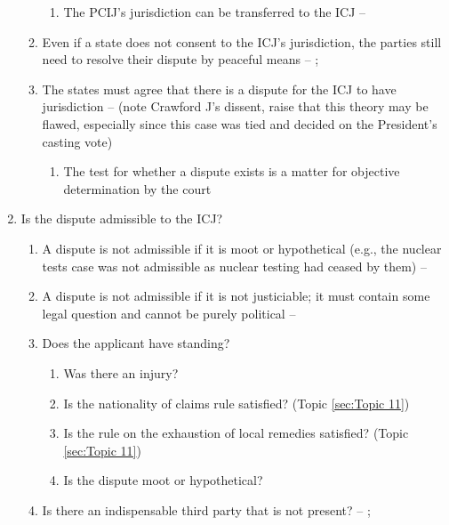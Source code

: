 \begin{enumerate}
\begin{enumerate}
\begin{enumerate}
            \item The PCIJ's jurisdiction can be transferred to the ICJ -- 
        \end{enumerate}
        \item Even if a state does not consent to the ICJ's jurisdiction, the parties still need to resolve their dispute by peaceful means -- ; 
        \item The states must agree that there is a dispute for the ICJ to have jurisdiction --  (note Crawford J's dissent, raise that this theory may be flawed, especially since this case was tied and decided on the President's casting vote)
        \begin{enumerate}
            \item The test for whether a dispute exists is a matter for objective determination by the court
        \end{enumerate}
    \end{enumerate}
    \item Is the dispute admissible to the ICJ?
    \begin{enumerate}
        \item A dispute is not admissible if it is moot or hypothetical (e.g., the nuclear tests case was not admissible as nuclear testing had ceased by them) -- 
        \item A dispute is not admissible if it is not justiciable; it must contain some legal question and cannot be purely political -- 
        \item Does the applicant have standing?
        \begin{enumerate}
            \item Was there an injury?
            \item Is the nationality of claims rule satisfied? (Topic \ref{sec:Topic 11})
            \item Is the rule on the exhaustion of local remedies satisfied? (Topic \ref{sec:Topic 11})
            \item Is the dispute moot or hypothetical?
        \end{enumerate}
        \item Is there an indispensable third party that is not present? -- ; 

\end{enumerate}
\end{enumerate}
